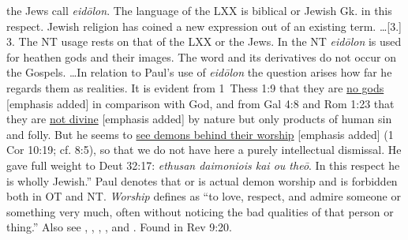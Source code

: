 the Jews call \emph{eidōlon}. The language of the LXX is biblical or Jewish Gk. in this respect. Jewish religion has coined a new expression out of an existing term. \ldots [3.] 3. The NT usage rests on that of the LXX or the Jews. In the NT \emph{eidōlon} is used for heathen gods and their images. The word and its derivatives do not occur on the Gospels. \ldots In relation to Paul's use of \emph{eidōlon} the question arises how far he regards them as realities. It is evident from 1~Thess 1:9 that they are \underline{no gods} [emphasis added] in comparison with God, and from Gal 4:8 and Rom 1:23 that they are \underline{not divine} [emphasis added] by nature but only products of human sin and folly. But he seems to \underline{see demons behind their worship} [emphasis added] (1 Cor 10:19; cf. 8:5), so that we do not have here a purely intellectual dismissal. He gave full weight to Deut 32:17: \emph{ethusan daimoniois kai ou theō}. In this respect he is wholly Jewish.''
 Paul denotes that  or  is actual demon worship and is forbidden both in OT and NT. \emph{Worship} defines as ``to love, respect, and admire someone or something very much, often without noticing the bad qualities of that person or thing.'' Also see , , , , and .
Found in Rev 9:20.
